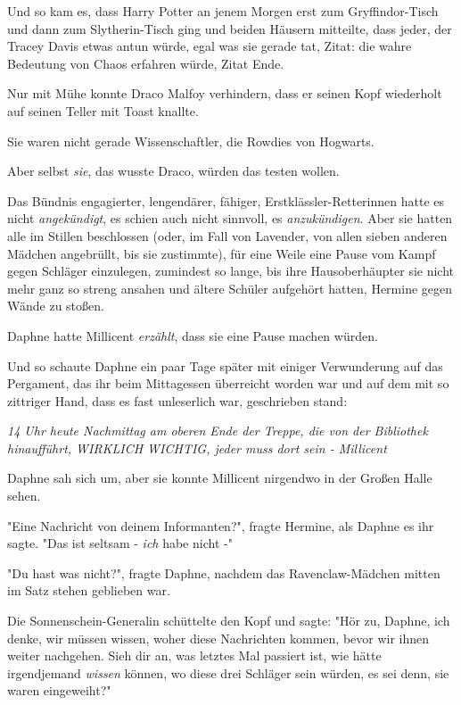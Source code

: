 {Und so kam es, dass Harry Potter an jenem Morgen erst zum Gryffindor-Tisch und dann zum Slytherin-Tisch ging und beiden Häusern mitteilte, dass jeder, der Tracey Davis etwas antun würde, egal was sie gerade tat, Zitat: die wahre Bedeutung von Chaos erfahren würde, Zitat Ende.

Nur mit Mühe konnte Draco Malfoy verhindern, dass er seinen Kopf wiederholt auf seinen Teller mit Toast knallte.

Sie waren nicht gerade Wissenschaftler, die Rowdies von Hogwarts.

Aber selbst \emph{sie}, das wusste Draco, würden das testen wollen.

Das Bündnis engagierter, lengendärer, fähiger, Erstklässler-Retterinnen hatte es nicht \emph{angekündigt}, es schien auch nicht sinnvoll, es \emph{anzukündigen}. Aber sie hatten alle im Stillen beschlossen (oder, im Fall von Lavender, von allen sieben anderen Mädchen angebrüllt, bis sie zustimmte), für eine Weile eine Pause vom Kampf gegen Schläger einzulegen, zumindest so lange, bis ihre Hausoberhäupter sie nicht mehr ganz so streng ansahen und ältere Schüler aufgehört hatten, Hermine gegen Wände zu stoßen.

Daphne hatte Millicent \emph{erzählt}, dass sie eine Pause machen würden.

Und so schaute Daphne ein paar Tage später mit einiger Verwunderung auf das Pergament, das ihr beim Mittagessen überreicht worden war und auf dem mit so zittriger Hand, dass es fast unleserlich war, geschrieben stand:

\emph{14 Uhr heute Nachmittag am oberen Ende der Treppe, die von der Bibliothek hinaufführt, WIRKLICH WICHTIG, jeder muss dort sein - Millicent}

Daphne sah sich um, aber sie konnte Millicent nirgendwo in der Großen Halle sehen.

"Eine Nachricht von deinem Informanten?", fragte Hermine, als Daphne es ihr sagte. "Das ist seltsam - \emph{ich} habe nicht -"

"Du hast was nicht?", fragte Daphne, nachdem das Ravenclaw-Mädchen mitten im Satz stehen geblieben war.

Die Sonnenschein-Generalin schüttelte den Kopf und sagte: "Hör zu, Daphne, ich denke, wir müssen wissen, woher diese Nachrichten kommen, bevor wir ihnen weiter nachgehen. Sieh dir an, was letztes Mal passiert ist, wie hätte irgendjemand \emph{wissen} können, wo diese drei Schläger sein würden, es sei denn, sie waren eingeweiht?"

}
